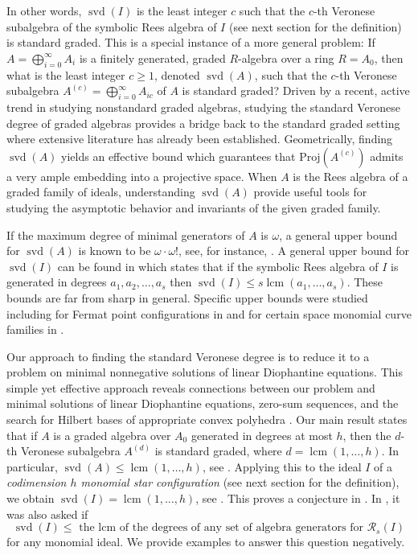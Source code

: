 \documentclass[12pt]{amsart}
\numberwithin{equation}{section}
\theoremstyle{definition}
\DeclareMathOperator{\lcm}{lcm}
\DeclareMathOperator{\svd}{svd}
\def\R{{\mathcal R}}
\def\R{{\mathcal R}}
\begin{document}
In other words, $\svd(I)$ is the least integer $c$ such that the $c$-th Veronese subalgebra of the symbolic Rees algebra of $I$ (see next section for the definition) is standard graded. This is a special instance of a more general problem: If $A=\bigoplus_{i=0}^\infty A_i$ is a finitely generated, graded $R$-algebra over a ring $R=A_0$, then what is the least integer $c\ge 1$, denoted $\svd(A)$, such that the $c$-th Veronese subalgebra $A^{(c)}=\bigoplus_{i=0}^\infty A_{ic}$ of $A$ is standard graded? Driven by a recent, active trend in studying nonstandard graded algebras, studying the standard Veronese degree of graded algebras provides a bridge back to the standard graded setting where extensive literature has already been established. Geometrically, finding $\svd(A)$ yields an effective bound which guarantees that $\text{Proj}(A^{(c)})$ admits a very ample embedding into a projective space. When $A$ is the Rees algebra of a graded family of ideals, understanding $\svd(A)$ provide useful tools for studying the asymptotic behavior and invariants of the given graded family.

If the maximum degree of minimal generators of $A$ is $\omega$, a general upper bound for $\svd(A)$ is known to be $\omega \cdot \omega!$, see, for instance, \cite{symbolicReesSurvey}. A general upper bound for $\svd(I)$ can be found in \cite{Rees58} which states that if the symbolic Rees algebra of $I$ is generated in degrees $a_1,a_2,\ldots,a_s$ then $\svd(I)\le s\lcm(a_1,\ldots ,a_s)$. These bounds are far from sharp in general. Specific upper bounds were studied including for Fermat point configurations in \cite{NagelSeceleanu} and for certain space monomial curve families in \cite{Mor91}. 

Our approach to finding the standard Veronese degree is to reduce it to a problem on minimal nonnegative solutions of linear Diophantine equations. This simple yet effective approach reveals connections between our problem and minimal solutions of linear Diophantine equations, zero-sum sequences, and the search for Hilbert bases of appropriate convex polyhedra \cite{HenkWeis, Sissokho21}. Our main result states that if $A$ is a graded algebra over $A_0$ generated in degrees at most $h$, then the $d$-th Veronese subalgebra $A^{(d)}$ is standard graded, where $d = \lcm(1,\dots,h)$. In particular, $\svd(A) \le \lcm(1,\dots,h)$, see . Applying this to the ideal $I$ of a \textit{codimension $h$ monomial star configuration} (see next section for the definition), we obtain $\svd(I) = \lcm(1,\ldots ,h)$, see . This proves a conjecture in \cite{symbolicReesSurvey}. In \cite[Question 3.10]{symbolicReesSurvey}, it was also asked if 
\[
\svd(I) \le \text{ the lcm of the degrees of any set of algebra generators for } \R_s(I)
\]
for any monomial ideal. We provide examples to answer this question negatively.
\end{document}
